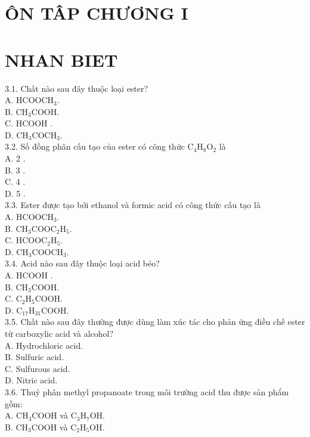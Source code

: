 \documentclass[10pt]{article}
\begin{document}
\section*{ÔN TÂP CHƯƠNG I}
\section*{NHAN BIET}
3.1. Chất nào sau đây thuộc loại ester?\\
A. $\mathrm{HCOOCH}_{3}$.\\
B. $\mathrm{CH}_{3} \mathrm{COOH}$.\\
C. HCOOH .\\
D. $\mathrm{CH}_{3} \mathrm{COCH}_{3}$.\\
3.2. Số đồng phân cấu tạo của ester có công thức $\mathrm{C}_{4} \mathrm{H}_{8} \mathrm{O}_{2}$ là\\
A. 2 .\\
B. 3 .\\
C. 4 .\\
D. 5 .\\
3.3. Ester được tạo bởi ethanol và formic acid có công thức cấu tạo là\\
A. $\mathrm{HCOOCH}_{3}$.\\
B. $\mathrm{CH}_{3} \mathrm{COOC}_{2} \mathrm{H}_{5}$.\\
C. $\mathrm{HCOOC}_{2} \mathrm{H}_{5}$.\\
D. $\mathrm{CH}_{3} \mathrm{COOCH}_{3}$.\\
3.4. Acid nào sau đây thuộc loại acid béo?\\
A. HCOOH .\\
B. $\mathrm{CH}_{3} \mathrm{COOH}$.\\
C. $\mathrm{C}_{2} \mathrm{H}_{5} \mathrm{COOH}$.\\
D. $\mathrm{C}_{17} \mathrm{H}_{31} \mathrm{COOH}$.\\
3.5. Chất nào sau đây thường được dùng làm xúc tác cho phản ứng điều chế ester từ carboxylic acid và alcohol?\\
A. Hydrochloric acid.\\
B. Sulfuric acid.\\
C. Sulfurous acid.\\
D. Nitric acid.\\
3.6. Thuỷ phân methyl propanoate trong môi trường acid thu được sản phẩm gồm:\\
A. $\mathrm{CH}_{3} \mathrm{COOH}$ và $\mathrm{C}_{3} \mathrm{H}_{7} \mathrm{OH}$.\\
B. $\mathrm{CH}_{3} \mathrm{COOH}$ và $\mathrm{C}_{2} \mathrm{H}_{5} \mathrm{OH}$.\\
\end{document}
